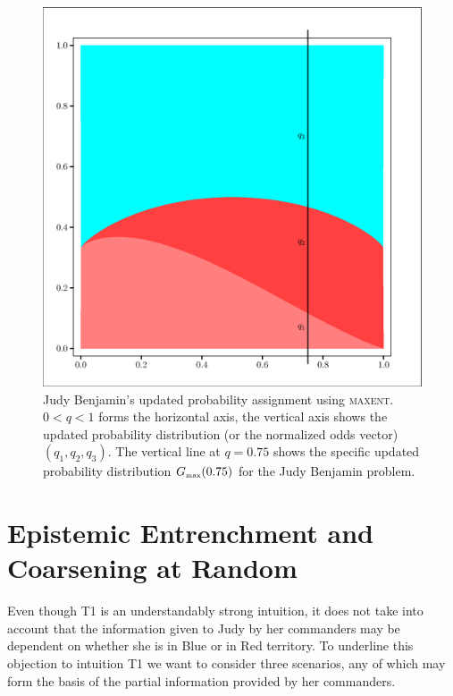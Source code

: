 \documentclass[12pt]{article}
\begin{document}
\begin{figure}[h]
  \begin{flushright}
    \begin{minipage}[h]{\lwv\linewidth}
      \includegraphics[width=\textwidth]{zeroone-mxnt.eps}
      \caption{Judy Benjamin's updated probability assignment using
        \textsc{maxent}. $0<q<1$ forms the horizontal axis, the
        vertical axis shows the updated probability distribution (or
        the normalized odds vector) $(q_{1},q_{2},q_{3})$. The
        vertical line at $q=0.75$ shows the specific updated
        probability distribution $G_{\mbox{\tiny max}}(0.75)$ for the Judy
        Benjamin problem.}
      \label{fig:mxnt}
    \end{minipage}
  \end{flushright}
\end{figure}

\section{Epistemic Entrenchment and Coarsening at Random}
\label{sec:3}

\nias Even though T1 is an understandably strong intuition, it does
not take into account that the information given to Judy by her
commanders may be dependent on whether she is in Blue or in Red
territory. To underline this objection to intuition T1 we want to
consider three scenarios, any of which may form the basis of the
partial information provided by her commanders.
\end{document}
